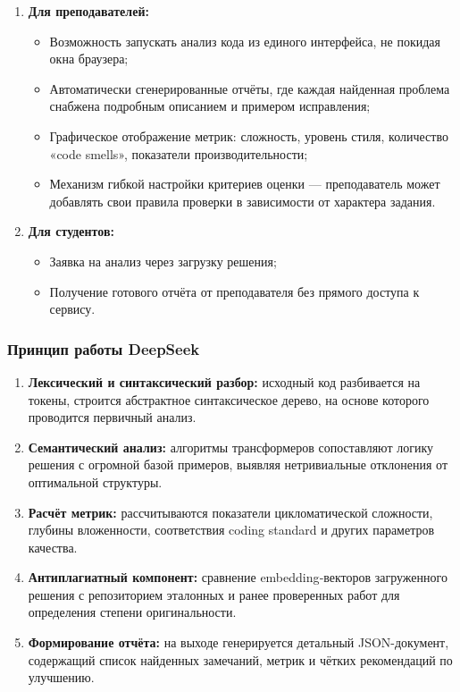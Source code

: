 \begin{enumerate}
	\item \textbf{Для преподавателей:}
		\begin{itemize}
		  \item Возможность запускать анализ кода из единого интерфейса, не покидая окна браузера;
		  \item Автоматически сгенерированные отчёты, где каждая найденная проблема снабжена подробным описанием и примером исправления;
		  \item Графическое отображение метрик: сложность, уровень стиля, количество «code smells», показатели производительности;
		  \item Механизм гибкой настройки критериев оценки — преподаватель может добавлять свои правила проверки в зависимости от характера задания.
		\end{itemize}
	
	\item \textbf{Для студентов:}
		\begin{itemize}
		  \item Заявка на анализ через загрузку решения;
		  \item Получение готового отчёта от преподавателя без прямого доступа к сервису.
		\end{itemize}
\end{enumerate}


\subsubsection{Принцип работы DeepSeek}

\begin{enumerate}
  \item \textbf{Лексический и синтаксический разбор:} исходный код разбивается на токены, строится абстрактное синтаксическое дерево, на основе которого проводится первичный анализ.
  \item \textbf{Семантический анализ:} алгоритмы трансформеров сопоставляют логику решения с огромной базой примеров, выявляя нетривиальные отклонения от оптимальной структуры.
  \item \textbf{Расчёт метрик:} рассчитываются показатели цикломатической сложности, глубины вложенности, соответствия coding standard и других параметров качества.
  \item \textbf{Антиплагиатный компонент:} сравнение embedding‐векторов загруженного решения с репозиторием эталонных и ранее проверенных работ для определения степени оригинальности.
  \item \textbf{Формирование отчёта:} на выходе генерируется детальный JSON-документ, содержащий список найденных замечаний, метрик и чётких рекомендаций по улучшению.
\end{enumerate}
